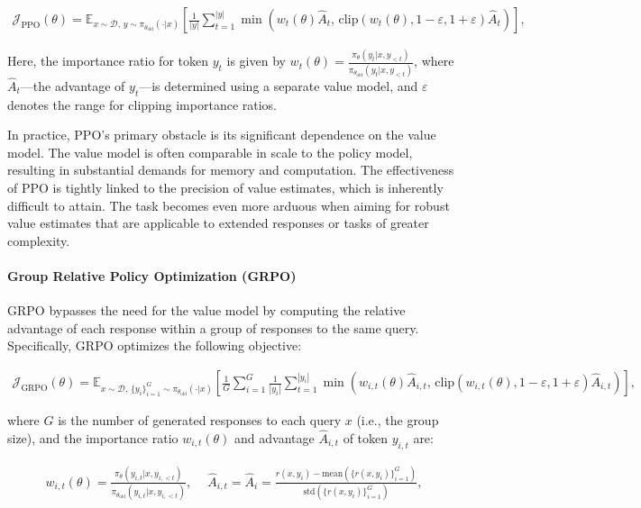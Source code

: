 \begin{align}
\mathcal{J}_\text{PPO}(\theta) = \mathbb{E}_{ x \sim \mathcal{D},\, y \sim \pi_{\theta_\text{old}}( \cdot | x) }
\left[ \frac{1}{|y|} \sum_{t=1}^{|y|} 
\min \left( w_{t}(\theta) \widehat{A}_{t},  \, \mathrm{clip} \left( w_{t}(\theta), 1 - {\varepsilon}, 1 + {\varepsilon}\right) \widehat{A}_{t} \right)
\right],
\end{align}

Here, the importance ratio for token $y_t$ is given by $
w_{t}(\theta) = \frac{ \pi_{\theta} (y_{t} | x, y_{<t}) }{ \pi_{\theta_\text{old}} (y_{t} | x,y_{<t})} $, where $\widehat{A}_{t}$—the advantage of $y_t$—is determined using a separate value model, and $\varepsilon$ denotes the range for clipping importance ratios.

In practice, PPO's primary obstacle is its significant dependence on the value model. The value model is often comparable in scale to the policy model, resulting in substantial demands for memory and computation. The effectiveness of PPO is tightly linked to the precision of value estimates, which is inherently difficult to attain. The task becomes even more arduous when aiming for robust value estimates that are applicable to extended responses or tasks of greater complexity.

\paragraph{Group Relative Policy Optimization (GRPO)} GRPO \citep{grpo} bypasses the need for the value model by computing the relative advantage of each response within a group of responses to the same query. Specifically, GRPO optimizes the following objective:

\begin{align}
\label{equ:grpo}
\mathcal{J}_\text{GRPO}(\theta) = \mathbb{E}_{ x \sim \mathcal{D},\, \{y_i\}_{i=1}^G \sim \pi_{\theta_\text{old}}( \cdot | x) }
\left[ \frac{1}{G} \sum_{i=1}^{G} \frac{1}{|y_i|} \sum_{t=1}^{|y_i|} 
\min \left( w_{i,t}(\theta) \widehat{A}_{i,t},  \, \mathrm{clip} \left( w_{i,t}(\theta), 1 - {\varepsilon}, 1 + {\varepsilon}\right) \widehat{A}_{i,t} \right)
\right],
\end{align}

where $G$ is the number of generated responses to each query $x$ (i.e., the group size), and the importance ratio $w_{i,t}(\theta)$ and advantage $\widehat{A}_{i,t}$ of token $y_{i,t}$ are:

\begin{align}
    w_{i,t}(\theta)=\frac{ \pi_{\theta} (y_{i,t} | x, y_{i,<t}) }{ \pi_{\theta_\text{old}} (y_{i,t} | x,y_{i,<t})},\quad\ 
    \widehat{A}_{i,t} = \widehat{A}_{i} = \frac{r(x, y_i) - \mathrm{mean} \left( \{ r(x, y_i) \}_{i=1}^G \right) }{ \mathrm{std} \left( \{ r(x, y_i) \}_{i=1}^G \right) },
\end{align}

